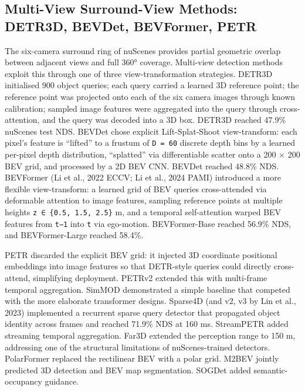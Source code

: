 \documentclass{article}
\begin{document}
\subsection{Multi-View Surround-View Methods: DETR3D, BEVDet, BEVFormer, PETR}\label{multi-view-surround-view-methods-detr3d-bevdet-bevformer-petr}

The six-camera surround ring of nuScenes provides partial geometric overlap between adjacent views and full 360° coverage. Multi-view detection methods exploit this through one of three view-transformation strategies. DETR3D \citep{wang2022detr3d3dobjectdete} initialised 900 object queries; each query carried a learned 3D reference point; the reference point was projected onto each of the six camera images through known calibration; sampled image features were aggregated into the query through cross-attention, and the query was decoded into a 3D box. DETR3D reached 47.9\% nuScenes test NDS. BEVDet \citep{huang2021bevdethighperforma} chose explicit Lift-Splat-Shoot view-transform: each pixel's feature is ``lifted'' to a frustum of \texttt{D\ =\ 60} discrete depth bins by a learned per-pixel depth distribution, ``splatted'' via differentiable scatter onto a 200 × 200 BEV grid, and processed by a 2D BEV CNN. BEVDet reached 48.8\% NDS. BEVFormer (Li et al., 2022 ECCV; Li et al., 2024 PAMI) introduced a more flexible view-transform: a learned grid of BEV queries cross-attended via deformable attention to image features, sampling reference points at multiple heights \texttt{z\ ∈\ \{0.5,\ 1.5,\ 2.5\}} m, and a temporal self-attention warped BEV features from \texttt{t−1} into \texttt{t} via ego-motion. BEVFormer-Base reached 56.9\% NDS, and BEVFormer-Large reached 58.4\%.

PETR \citep{liu2022petrpositionembedd} discarded the explicit BEV grid: it injected 3D coordinate positional embeddings into image features so that DETR-style queries could directly cross-attend, simplifying deployment. PETRv2 \citep{liu2022petrpositionembedd} extended this with multi-frame temporal aggregation. SimMOD \citep{zhang2023asimplebaselinefor} demonstrated a simple baseline that competed with the more elaborate transformer designs. Sparse4D (and v2, v3 by Lin et al., 2023) implemented a recurrent sparse query detector that propagated object identity across frames and reached 71.9\% NDS at 160 ms. StreamPETR added streaming temporal aggregation. Far3D \citep{jiang2024far3dexpandingtheh} extended the perception range to 150 m, addressing one of the structural limitations of nuScenes-trained detectors. PolarFormer \citep{jiang2023polarformermultica} replaced the rectilinear BEV with a polar grid. M2BEV \citep{xie2022m2bevmulticamerajo} jointly predicted 3D detection and BEV map segmentation. SOGDet \citep{zhou2023unidistillaunivers} added semantic-occupancy guidance.
\end{document}
